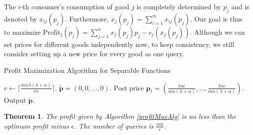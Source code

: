 \documentclass{article}
\newtheorem{theorem}{Theorem}[section]
\begin{document}
The $i$-th consumer's consumption of good $j$ is completely determined by $p_j$ and is denoted by $x_{ij}(p_j)$. Furthermore, $x_j(p_j)=\sum_{i=1}^{m}x_{ij}(p_j)$. Our goal is thus to maximize $\mathrm{Profit}_j(p_j)=\sum_{j=1}^{n}x_j(p_j)p_j-c_j(x_j(p_j))$. Although we can set prices for different goods independently now, to keep consistency, we still consider setting up a new price for every good as one query.
\begin{algorithm}
    \caption{Profit Maximization Algorithm for Separable Functions}
    \begin{algorithmic}
        \STATE $r\leftarrow\lceil \frac{mn\lambda(\lambda+\alpha)}{\alpha\epsilon}\rceil$.
        \STATE $\tilde{\mathbf{p}}=(0,0,\ldots,0)$.
            \STATE Post price $\mathbf{p}_t=(\frac{t\alpha\epsilon}{mn(\lambda+\alpha)},\ldots,\frac{t\alpha\epsilon}{mn(\lambda+\alpha)})$.
                \ENDIF
            \ENDFOR
        \ENDFOR
        \STATE Output $\tilde{\mathbf{p}}$.
    \end{algorithmic}
    \label{profitMaxAlg}
\end{algorithm}
\begin{theorem}
    The profit given by Algorithm \ref{profitMaxAlg} is no less than the optimum profit minus $\epsilon$. The number of queries is $\frac{mn}{\epsilon}$.
\end{theorem}
\end{document}
